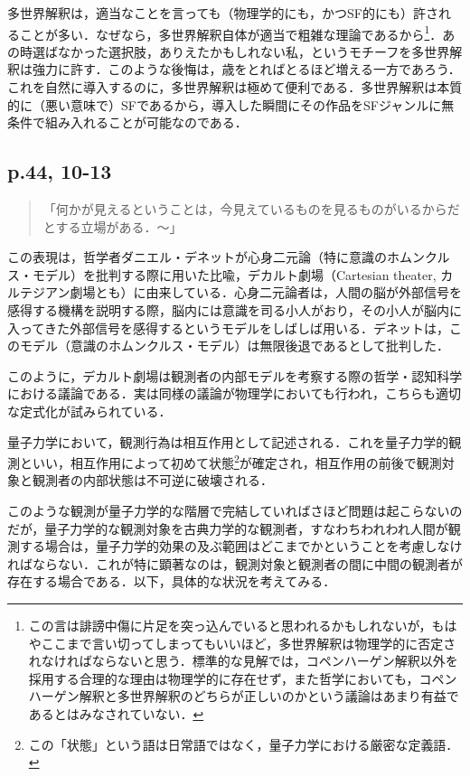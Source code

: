 \documentclass[10pt, a5paper, twoside]{jsarticle}
\theoremstyle{definition}
\begin{document}
                多世界解釈は，適当なことを言っても（物理学的にも，かつSF的にも）許されることが多い．なぜなら，多世界解釈自体が適当で粗雑な理論であるから\footnote{この言は誹謗中傷に片足を突っ込んでいると思われるかもしれないが，もはやここまで言い切ってしまってもいいほど，多世界解釈は物理学的に否定されなければならないと思う．標準的な見解では，コペンハーゲン解釈以外を採用する合理的な理由は物理学的に存在せず\cite{htt, smz}，また哲学においても，コペンハーゲン解釈と多世界解釈のどちらが正しいのかという議論はあまり有益であるとはみなされていない\cite{mrt}．}．あの時選ばなかった選択肢，ありえたかもしれない私，というモチーフを多世界解釈は強力に許す．このような後悔は，歳をとればとるほど増える一方であろう．これを自然に導入するのに，多世界解釈は極めて便利である．多世界解釈は本質的に（悪い意味で）SFであるから，導入した瞬間にその作品をSFジャンルに無条件で組み入れることが可能なのである．

            \subsection{p.44, 10-13}

                \begin{quote}

                    「何かが見えるということは，今見えているものを見るものがいるからだとする立場がある．〜」

                \end{quote}

                この表現は，哲学者ダニエル・デネットが心身二元論（特に意識のホムンクルス・モデル）を批判する際に用いた比喩，デカルト劇場（Cartesian theater, カルテジアン劇場とも）に由来している．心身二元論者は，人間の脳が外部信号を感得する機構を説明する際，脳内には意識を司る小人がおり，その小人が脳内に入ってきた外部信号を感得するというモデルをしばしば用いる．デネットは，このモデル（意識のホムンクルス・モデル）は無限後退であるとして批判した\cite{dnt}．

                このように，デカルト劇場は観測者の内部モデルを考察する際の哲学・認知科学における議論である．実は同様の議論が物理学においても行われ，こちらも適切な定式化が試みられている．

                量子力学において，観測行為は相互作用として記述される．これを量子力学的観測といい，相互作用によって初めて状態\footnote{この「状態」という語は日常語ではなく，量子力学における厳密な定義語．}が確定され，相互作用の前後で観測対象と観測者の内部状態は不可逆に破壊される．

                このような観測が量子力学的な階層で完結していればさほど問題は起こらないのだが，量子力学的な観測対象を古典力学的な観測者，すなわちわれわれ人間が観測する場合は，量子力学的効果の及ぶ範囲はどこまでかということを考慮しなければならない．これが特に顕著なのは，観測対象と観測者の間に中間の観測者が存在する場合である．以下，具体的な状況を考えてみる．
\end{document}
